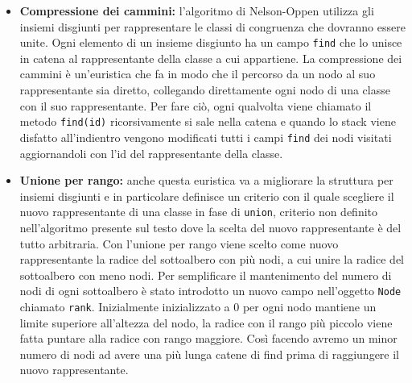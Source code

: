 \documentclass[a4paper,11pt]{article}
\begin{document}
\begin{itemize}
	\item {\bf Compressione dei cammini:} l'algoritmo di Nelson-Oppen utilizza gli insiemi disgiunti per rappresentare le classi di congruenza che dovranno essere unite. Ogni elemento di un insieme disgiunto ha un campo {\tt find} che lo unisce in catena al rappresentante della classe a cui appartiene.
La compressione dei cammini è un'euristica che fa in modo che il percorso da un nodo al suo rappresentante sia diretto, collegando direttamente ogni nodo di una classe con il suo rappresentante.
Per fare ciò, ogni qualvolta viene chiamato il metodo {\tt find(id)} ricorsivamente si sale nella catena e quando lo stack viene disfatto all'indientro vengono modificati tutti i campi {\tt find} dei nodi visitati aggiornandoli con l'id del rappresentante della classe.
	\item {\bf Unione per rango:} anche questa euristica va a migliorare la struttura per insiemi disgiunti e in particolare definisce un criterio con il quale scegliere il nuovo rappresentante di una classe in fase di {\tt union}, criterio non definito nell'algoritmo presente sul testo dove la scelta del nuovo rappresentante è del tutto arbitraria.
Con l'unione per rango viene scelto come nuovo rappresentante la radice del sottoalbero con più nodi, a cui unire la radice del sottoalbero con meno nodi. Per semplificare il mantenimento del numero di nodi di ogni sottoalbero è stato introdotto un nuovo campo nell'oggetto {\tt Node} chiamato {\tt rank}.
Inizialmente inizializzato a 0 per ogni nodo mantiene un limite superiore all'altezza del nodo, la radice con il rango più piccolo viene fatta puntare alla radice con rango maggiore.
Così facendo avremo un minor numero di nodi ad avere una più lunga catene di find prima di raggiungere il nuovo rappresentante. 


\end{itemize}
\end{document}
